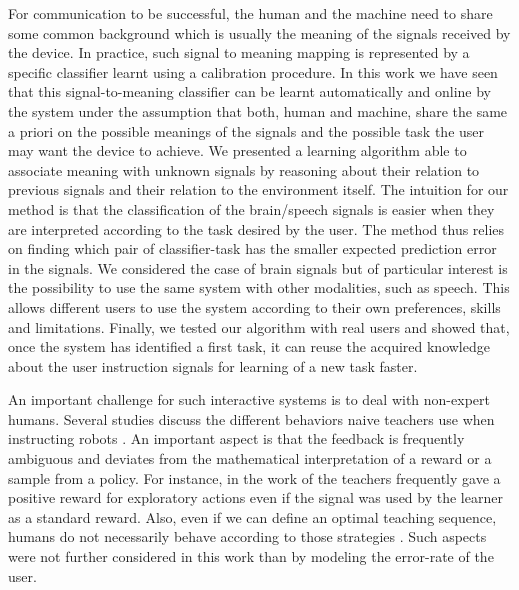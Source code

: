 \documentclass[conference]{IEEEtran}
\begin{document}
For communication to be successful, the human and the machine need to share some common background which is usually the meaning of the signals received by the device. In practice, such signal to meaning mapping is represented by a specific classifier learnt using a calibration procedure. In this work we have seen that this signal-to-meaning classifier can be learnt automatically and online by the system under the assumption that both, human and machine, share the same a priori on the possible meanings of the signals and the possible task the user may want the device to achieve. We presented a learning algorithm able to associate meaning with unknown signals by reasoning about their relation to previous signals and their relation to the environment itself. The intuition for our method is that the classification of the brain/speech signals is easier when they are interpreted according to the task desired by the user. The method thus relies on finding which pair of classifier-task has the smaller expected prediction error in the signals. We considered the case of brain signals but of particular interest is the possibility to use the same system with other modalities, such as speech. This allows different users to use the system according to their own preferences, skills and limitations. Finally, we tested our algorithm with real users and showed that, once the system has identified a first task, it can reuse the acquired knowledge about the user instruction signals for learning of a new task faster.

An important challenge for such interactive systems is to deal with non-expert humans. Several studies discuss the different behaviors naive teachers use when instructing robots \cite{Thomaz2008,Cakmak2010}. An important aspect is that the feedback is frequently ambiguous and deviates from the mathematical interpretation of a reward or a sample from a policy. For instance, in the work of \cite{Thomaz2008} the teachers frequently gave a positive reward for exploratory actions even if the signal was used by the learner as a standard reward. Also, even if we can define an optimal teaching sequence, humans do not necessarily behave according to those strategies \cite{Cakmak2010}. Such aspects were not further considered in this work than by modeling the error-rate of the user.
\end{document}
